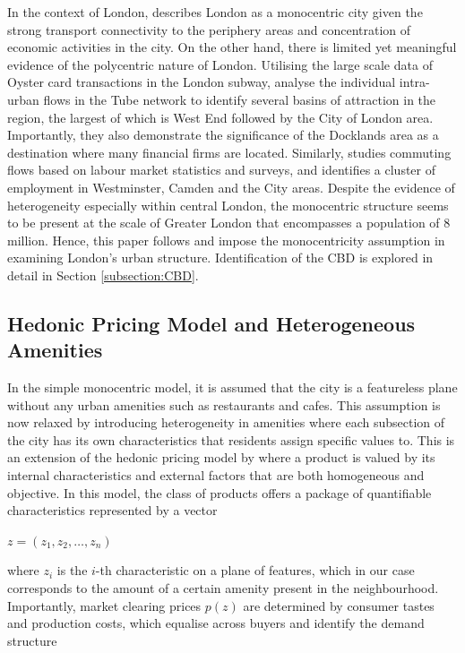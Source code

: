 \documentclass{article}
\begin{document}
In the context of London, \citet{EuropeanCommission1999ESDP:Union} describes London as a monocentric city given the strong transport connectivity to the periphery areas and concentration of economic activities in the city. On the other hand, there is limited yet meaningful evidence of the polycentric nature of London. Utilising the large scale data of Oyster card transactions in the London subway, \citet{Roth2011StructureFlows} analyse the individual intra-urban flows in the Tube network to identify several basins of attraction in the region, the largest of which is West End followed by the City of London area. Importantly, they also demonstrate the significance of the Docklands area as a destination where many financial firms are located. Similarly, \citet{Park2011SpatialAngeles} studies commuting flows based on labour market statistics and surveys, and identifies a cluster of employment in Westminster, Camden and the City areas. Despite the evidence of heterogeneity especially within central London, the monocentric structure seems to be present at the scale of Greater London that encompasses a population of 8 million. Hence, this paper follows \citet{Park2011SpatialAngeles} and impose the monocentricity assumption \citep{AlonsoWilliam1964Lalu} in examining London's urban structure. Identification of the CBD is explored in detail in Section \ref{subsection:CBD}.

\subsection{Hedonic Pricing Model and Heterogeneous Amenities} \label{subsection:hedonic} 
In the simple monocentric model, it is assumed that the city is a featureless plane without any urban amenities such as restaurants and cafes. This assumption is now relaxed by introducing heterogeneity in amenities where each subsection of the city has its own characteristics that residents assign specific values to. This is an extension of the hedonic pricing model by \citet{Rosen1984} where a product is valued by its internal characteristics and external factors that are both homogeneous and objective. In this model, the class of products offers a package of quantifiable characteristics represented by a vector 

\begin{center}
    $z = \left( z _ { 1 } , z _ { 2 } , \dots , z _ { n } \right)$
\end{center}

where $z_i$ is the $i$-th characteristic on a plane of features, which in our case corresponds to the amount of a certain amenity present in the neighbourhood. Importantly, market clearing prices $p(z)$ are determined by consumer tastes and production costs, which equalise across buyers and identify the demand structure
\end{document}
